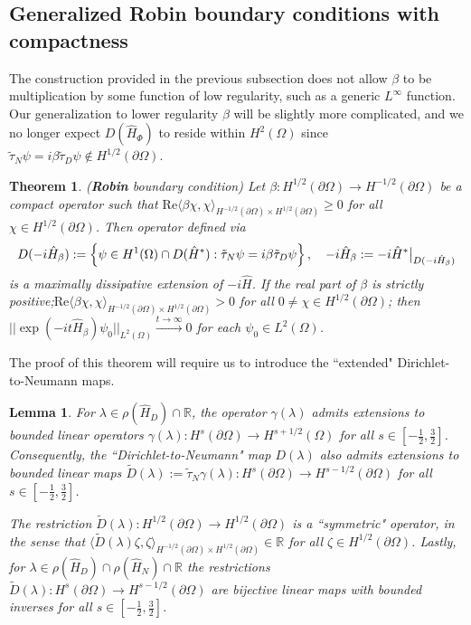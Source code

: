 \documentclass{article}
\numberwithin{equation}{section}
\newtheorem{theorem}{Theorem}[section]
\newtheorem{lemma}{Lemma}[section]
\begin{document}
    \subsection{Generalized Robin boundary conditions with compactness}
    The construction provided in the previous subsection does not allow $\beta$ to be multiplication by some function of low regularity, such as a generic $L^\infty$ function. Our generalization to lower regularity $\beta$ will be slightly more complicated, and we no longer expect $D(\hat{H}_\Phi)$ to reside within $H^2(\Omega)$ since $\tilde \tau_N\psi=i\beta\tilde \tau_D\psi \notin H^{1/2}(\partial \Omega)$.
    \begin{theorem}\label{Robin boundary conditions ugly}
    (\textbf{Robin} boundary condition) Let $\beta: H^{1/2}(\partial \Omega)\to H^{-1/2}(\partial \Omega)$ be a compact operator such that \em$\text{Re} \langle \beta \chi, \chi \rangle_{H^{-1/2}(\partial \Omega)\times H^{1/2}(\partial \Omega)}\geq 0$ \em for all $\chi \in H^{1/2}(\partial \Omega)$. Then operator defined via
    \begin{equation}
        D(-i\hat{H}_\beta):=\left\{\psi \in H^1(\Omega)\cap D(\hat{H}^*):\tilde{\tau}_N \psi=i \beta \tilde{\tau}_D \psi \right\}, \quad -i\hat{H}_\beta:=-i\hat{H}^*\big{|}_{D(-i\hat{H}_\beta)}
    \end{equation}
    is a maximally dissipative extension of $-i\hat{H}$.  If the real part of $\beta$ is strictly positive;\newline \em $\text{Re}\langle \beta \chi, \chi \rangle_{H^{-1/2}(\partial \Omega)\times H^{1/2}(\partial \Omega)}>0$ for all $0 \neq \chi \in H^{1/2}(\partial \Omega)$\em; then $||\exp(-it\hat{H}_\beta)\psi_0||_{L^2(\Omega)}\xrightarrow{t \to \infty}0$ for each $\psi_0 \in L^2(\Omega)$. 
\end{theorem} The proof of this theorem will require us to introduce the ``extended" Dirichlet-to-Neumann maps.
\begin{lemma}\label{Extended maps properties}
    For $\lambda \in \rho(\hat{H}_D)\cap \mathbb{R}$, the operator $\gamma(\lambda)$ admits extensions to bounded linear operators $\gamma(\lambda):H^s(\partial \Omega)\to H^{s+1/2}(\Omega)$ for all $s \in [-\frac{1}{2},\frac{3}{2}]$. Consequently, the ``Dirichlet-to-Neumann" map $D(\lambda)$ also admits extensions to bounded linear maps $\tilde{D}(\lambda):=\tilde{\tau}_N\gamma(\lambda):H^{s}(\partial \Omega)\to H^{s-1/2}(\partial \Omega)$ for all $s \in [-\frac{1}{2},\frac{3}{2}]$. 
    \par
    The restriction $\tilde{D}(\lambda):H^{1/2}(\partial \Omega)\to H^{1/2}(\partial \Omega)$ is a ``symmetric" operator, in the sense that $\langle \tilde{D}(\lambda)\zeta,\zeta \rangle_{H^{-1/2}(\partial \Omega)\times H^{1/2}(\partial \Omega)}\in\mathbb{R}$ for all $\zeta \in H^{1/2}(\partial \Omega)$. Lastly, for $\lambda \in \rho(\hat{H}_D)\cap\rho(\hat{H}_N)\cap \mathbb{R}$ the restrictions $\tilde{D}(\lambda):H^s(\partial \Omega)\to H^{s-1/2}(\partial \Omega)$ are bijective linear maps with bounded inverses for all $s\in [-\frac{1}{2},\frac{3}{2}]$.
\end{lemma}
\end{document}
